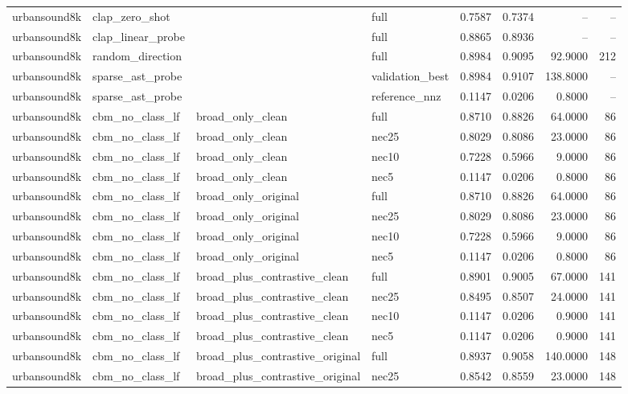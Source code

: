 \begin{table}[t]
\begin{tabular}{llllrrrr}
urbansound8k & clap\_zero\_shot &  & full & 0.7587 & 0.7374 & -- & -- \\
urbansound8k & clap\_linear\_probe &  & full & 0.8865 & 0.8936 & -- & -- \\
urbansound8k & random\_direction &  & full & 0.8984 & 0.9095 & 92.9000 & 212 \\
urbansound8k & sparse\_ast\_probe &  & validation\_best & 0.8984 & 0.9107 & 138.8000 & -- \\
urbansound8k & sparse\_ast\_probe &  & reference\_nnz & 0.1147 & 0.0206 & 0.8000 & -- \\
urbansound8k & cbm\_no\_class\_lf & broad\_only\_clean & full & 0.8710 & 0.8826 & 64.0000 & 86 \\
urbansound8k & cbm\_no\_class\_lf & broad\_only\_clean & nec25 & 0.8029 & 0.8086 & 23.0000 & 86 \\
urbansound8k & cbm\_no\_class\_lf & broad\_only\_clean & nec10 & 0.7228 & 0.5966 & 9.0000 & 86 \\
urbansound8k & cbm\_no\_class\_lf & broad\_only\_clean & nec5 & 0.1147 & 0.0206 & 0.8000 & 86 \\
urbansound8k & cbm\_no\_class\_lf & broad\_only\_original & full & 0.8710 & 0.8826 & 64.0000 & 86 \\
urbansound8k & cbm\_no\_class\_lf & broad\_only\_original & nec25 & 0.8029 & 0.8086 & 23.0000 & 86 \\
urbansound8k & cbm\_no\_class\_lf & broad\_only\_original & nec10 & 0.7228 & 0.5966 & 9.0000 & 86 \\
urbansound8k & cbm\_no\_class\_lf & broad\_only\_original & nec5 & 0.1147 & 0.0206 & 0.8000 & 86 \\
urbansound8k & cbm\_no\_class\_lf & broad\_plus\_contrastive\_clean & full & 0.8901 & 0.9005 & 67.0000 & 141 \\
urbansound8k & cbm\_no\_class\_lf & broad\_plus\_contrastive\_clean & nec25 & 0.8495 & 0.8507 & 24.0000 & 141 \\
urbansound8k & cbm\_no\_class\_lf & broad\_plus\_contrastive\_clean & nec10 & 0.1147 & 0.0206 & 0.9000 & 141 \\
urbansound8k & cbm\_no\_class\_lf & broad\_plus\_contrastive\_clean & nec5 & 0.1147 & 0.0206 & 0.9000 & 141 \\
urbansound8k & cbm\_no\_class\_lf & broad\_plus\_contrastive\_original & full & 0.8937 & 0.9058 & 140.0000 & 148 \\
urbansound8k & cbm\_no\_class\_lf & broad\_plus\_contrastive\_original & nec25 & 0.8542 & 0.8559 & 23.0000 & 148 \\

\end{tabular}
\end{table}
